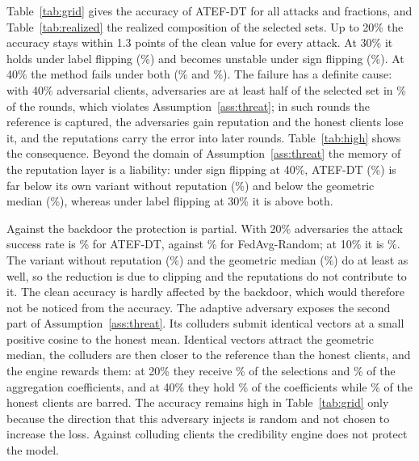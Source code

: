 Table~\ref{tab:grid} gives the accuracy of ATEF-DT for all attacks and fractions, and Table~\ref{tab:realized} the realized composition of the selected sets. Up to 20\% the accuracy stays within 1.3 points of the clean value for every attack. At 30\% it holds under label flipping (\%) and becomes unstable under sign flipping (\%). At 40\% the method fails under both (\% and \%). The failure has a definite cause: with 40\% adversarial clients, adversaries are at least half of the selected set in \% of the rounds, which violates Assumption~\ref{ass:threat}; in such rounds the reference is captured, the adversaries gain reputation and the honest clients lose it, and the reputations carry the error into later rounds. Table~\ref{tab:high} shows the consequence. Beyond the domain of Assumption~\ref{ass:threat} the memory of the reputation layer is a liability: under sign flipping at 40\%, ATEF-DT (\%) is far below its own variant without reputation (\%) and below the geometric median (\%), whereas under label flipping at 30\% it is above both.

Against the backdoor the protection is partial. With 20\% adversaries the attack success rate is \% for ATEF-DT, against \% for FedAvg-Random; at 10\% it is \%. The variant without reputation (\%) and the geometric median (\%) do at least as well, so the reduction is due to clipping and the reputations do not contribute to it. The clean accuracy is hardly affected by the backdoor, which would therefore not be noticed from the accuracy. The adaptive adversary exposes the second part of Assumption~\ref{ass:threat}. Its colluders submit identical vectors at a small positive cosine to the honest mean. Identical vectors attract the geometric median, the colluders are then closer to the reference than the honest clients, and the engine rewards them: at 20\% they receive \% of the selections and \% of the aggregation coefficients, and at 40\% they hold \% of the coefficients while \% of the honest clients are barred. The accuracy remains high in Table~\ref{tab:grid} only because the direction that this adversary injects is random and not chosen to increase the loss. Against colluding clients the credibility engine does not protect the model.

